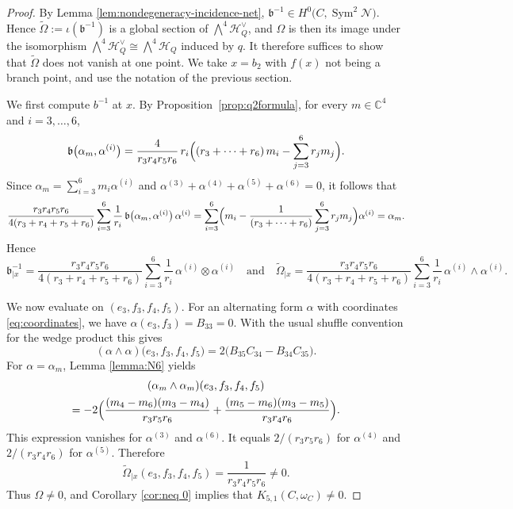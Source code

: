 \documentclass[11pt]{amsart}
\theoremstyle{definition}
\begin{document}
\begin{proof}
By Lemma \ref{lem:nondegeneracy-incidence-net}, $\mathfrak{b}^{-1}\in H^0\bigl(C,\operatorname{Sym}^2\mathcal N\bigr)$. Hence $\widetilde\Omega:=\iota(\mathfrak{b}^{-1})$ is a global section of $\bigwedge^4\mathcal H_Q^\vee$, and $\Omega$ is then its image under the isomorphism $\bigwedge^4\mathcal H_Q^\vee\cong\bigwedge^4\mathcal H_Q$ induced by $q$. It therefore suffices to show that $\widetilde\Omega$ does not vanish at one point. We take $x=b_2$ with $f(x)$ not being a branch point, and use the notation of the previous section.

We first compute $b^{-1}$ at $x$. By Proposition~\ref{prop:q2formula}, for every $m\in\mathbb C^4$ and $i=3,\dots,6$,
\[
\mathfrak{b}\bigl(\alpha_m,\alpha^{(i)}\bigr)=\frac{4}{r_3r_4r_5r_6}\,r_i\Bigl((r_3+\cdots+r_6)\,m_i-\sum_{j=3}^6 r_jm_j\Bigr).
\]
Since $\alpha_m=\sum_{i=3}^6 m_i\alpha^{(i)}$ and   $\alpha^{(3)}+\alpha^{(4)}+\alpha^{(5)}+\alpha^{(6)}=0$, it follows that
\[
\frac{r_3r_4r_5r_6}{4(r_3+r_4+r_5+r_6)}\sum_{i=3}^6\frac{1}{r_i}\,\mathfrak{b}\bigl(\alpha_m,\alpha^{(i)}\bigr)\,\alpha^{(i)}=\sum_{i=3}^6\Bigl(m_i-\frac{1}{(r_3+\cdots+r_6)}\sum_{j=3}^6 r_jm_j\Bigr)\alpha^{(i)}=\alpha_m .
\]
Hence
\[
\mathfrak{b}^{-1}_{|x}=\frac{r_3r_4r_5r_6}{4(r_3+r_4+r_5+r_6)}\sum_{i=3}^{6}\frac1{r_i}\,\alpha^{(i)}\otimes\alpha^{(i)}
\quad\text{and}\quad
\widetilde\Omega_{|x}=\frac{r_3r_4r_5r_6}{4(r_3+r_4+r_5+r_6)}\sum_{i=3}^{6}\frac1{r_i}\,\alpha^{(i)}\wedge\alpha^{(i)}.
\]

We now evaluate on $(e_3,f_3,f_4,f_5)$. For an alternating form $\alpha$ with coordinates \eqref{eq:coordinates}, we have $\alpha(e_3,f_3)=B_{33}=0$. With the usual shuffle convention for the wedge product this gives
\[
(\alpha\wedge\alpha)\bigl(e_3,f_3,f_4,f_5\bigr)=2\bigl(B_{35}C_{34}-B_{34}C_{35}\bigr).
\]
For $\alpha=\alpha_m$, Lemma \ref{lemma:N6} yields
\begin{multline*}
(\alpha_m\wedge\alpha_m)(e_3,f_3,f_4,f_5)\\
=-2\Bigl(\frac{(m_4-m_6)(m_3-m_4)}{r_3r_5r_6}+\frac{(m_5-m_6)(m_3-m_5)}{r_3r_4r_6}\Bigr).
\end{multline*}
This expression vanishes for $\alpha^{(3)}$ and $\alpha^{(6)}$. It equals $2/(r_3r_5r_6)$ for $\alpha^{(4)}$ and $2/(r_3r_4r_6)$ for $\alpha^{(5)}$. Therefore
\[
\widetilde\Omega_{|x}(e_3,f_3,f_4,f_5)=\frac{1}{r_3r_4r_5r_6}\neq0 .
\]
Thus $\Omega\neq0$, and Corollary \ref{cor:neq 0} implies that $K_{5,1}(C,\omega_C)\neq0$.
\end{proof}
\end{document}
